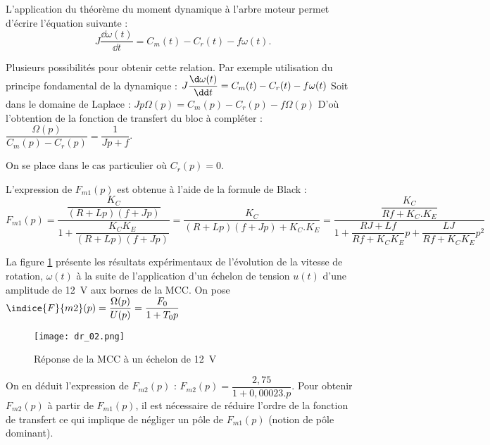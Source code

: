 \ifprof
\else
L'application du théorème du moment dynamique à l'arbre moteur permet d'écrire l'équation suivante : 
$$
J\dfrac{\dd \omega(t)}{\dd t}  = C_m(t)-C_r(t)-f\omega(t).
$$
\fi

\ifprof
\begin{corrige}%
Plusieurs possibilités pour obtenir cette relation. Par exemple utilisation du principe fondamental de la dynamique :
$J\dfrac{\d\omega(t)}{\dd t}=C_m (t)-C_r (t)-f\omega(t)$ 
Soit dans le domaine de Laplace : $Jp\Omega(p)=C_m (p)-C_r (p)-f\Omega(p)$
D’où l’obtention de la fonction de transfert du bloc à compléter :  $\dfrac{\Omega(p)}{C_m (p)-C_r (p) }=\dfrac{1}{Jp+f}$.

\end{corrige}
\else
\fi

\ifprof
\else
On se place dans le cas particulier où $C_r(p) = 0$.
\fi

\ifprof
\begin{corrige}%
L’expression de $F_{m1}(p)$ est obtenue à l’aide de la formule de Black :
$F_{m1} (p)=\dfrac{\dfrac{K_C}{(R+Lp)(f+Jp)}}{1+\dfrac{K_CK_E}{(R+Lp)(f+Jp)}}=\dfrac{K_C}{(R+Lp)(f+Jp)+K_C.K_E }=\dfrac{\dfrac{K_C}{Rf+K_C.K_E}}{1+\dfrac{RJ+Lf}{Rf+K_CK_E }p+\dfrac{LJ}{Rf+K_CK_E} p^2 }$

\end{corrige}
\else
\fi

\ifprof
\else

La figure \ref{dr_02} présente les résultats expérimentaux de l’évolution de la vitesse de rotation, $\omega(t)$ à la suite de l’application d’un échelon de tension $u(t)$ d’une amplitude de \SI{12}{V} aux bornes de la MCC. On pose $\indice{F}{m2}(p)=\dfrac{\Omega(p)}{U(p)} = \dfrac{F_0}{1+T_0p}$

\begin{figure}[!h]
\centering
\texttt{[image: dr\_02.png]}
\caption{Réponse de la MCC à un échelon de \SI{12}{V}\label{dr_02}}
\end{figure}
\fi

\ifprof
\begin{corrige}%
On en déduit l’expression de $F_{m2}(p)$ :
$F_{m2}(p)=\dfrac{2,75}{1+0,00023.p}$.
Pour obtenir $F_{m2}(p)$ à partir de $F_{m1}(p)$, il est nécessaire de réduire l’ordre de la fonction de transfert ce qui implique de négliger un pôle de $F_{m1}(p)$ (notion de pôle dominant).

\end{corrige}
\else
\fi

